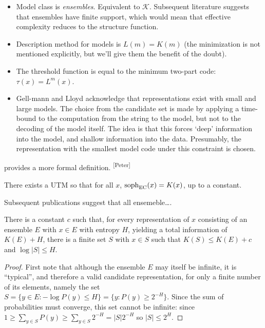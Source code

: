 \documentclass{style/llncs}
\newcommand{\K}{\mathscr K}
\newcommand{\tn}[1]{\textnormal{#1}}
\newcommand{\s}{\tn{soph}}
\newcommand{\pb}[1]{\textcolor{OliveGreen}{\small #1 \textsuperscript{[Peter]} }}
\begin{document}
\begin{itemize}
\item Model class is \emph{ensembles}. Equivalent to $\K$. Subsequent literature suggests that ensembles have finite support, which would mean that effective complexity reduces to the structure function.
\item Description method for models is $L(m) = K(m)$ (the minimization is not mentioned explicitly, but we'll give them the benefit of the doubt).
\item The threshold function is equal to the minimum two-part code: $\tau(x)=L^m(x)$.
\item Gell-mann and Lloyd acknowledge that representations exist with small and large models. The choice from the candidate set is made by applying a time-bound to the computation from the string to the model, but not to the decoding of the model itself. The idea is that this forces `deep' information into the model, and shallow information into the data. Presumably, the representation with the smallest model code under this constraint is chosen.   
\end{itemize} 

\pb{\cite{ay2010effective} provides a more formal definition.}
\begin{theorem}
There exists a UTM so that for all $x$, $\s_\text{EC}(x) = K(x)$, up to a constant. 
\end{theorem}

Subsequent publications suggest that all ensemeble\ldots.  

\begin{theorem}
  There is a constant $c$ such that, for every representation of $x$
  consisting of an ensemble $E$ with $x\in E$ with entropy $H$,
  yielding a total information of $K(E)+H$, there is a finite set $S$
  with $x\in S$ such that $K(S)\le K(E)+c$ and $\log|S|\le H$.
\end{theorem}
\begin{proof}
  First note that although the ensemble $E$ may itself be infinite, it
  is ``typical'', and therefore a valid candidate representation, for
  only a finite number of its elements, namely the set $S=\{y\in E:-\log
  P(y)\le H\} = \{y:P(y)\ge 2^{-H}\}$. Since the sum of probabilities must
  converge, this set cannot be infinite: since $1\ge\sum_{y\in S} P(y)\ge
  \sum_{y\in S}2^{-H} = |S|2^{-H}$ so $|S|\le 2^H$.
\end{proof}
\end{document}
